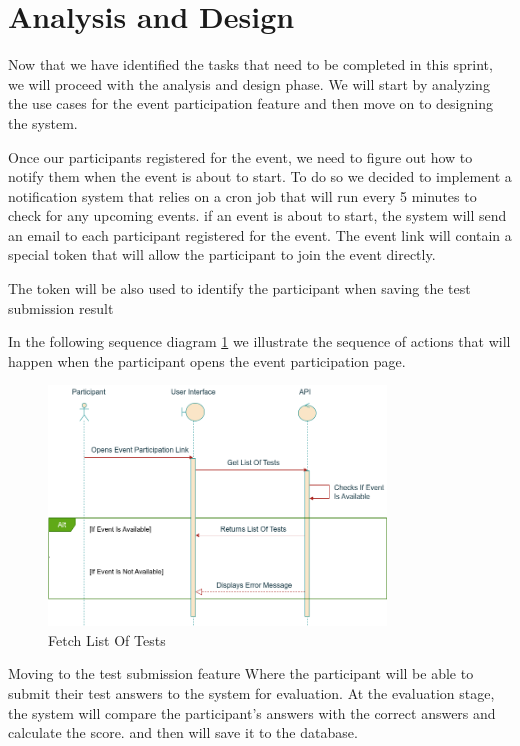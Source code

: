 \section{Analysis and Design}
Now that we have identified the tasks that need to be completed in this sprint, we will proceed with the analysis and design phase.
We will start by analyzing the use cases for the event participation feature and then move on to designing the system.

Once our participants registered for the event, we need to figure out how to notify them when the event is about to start.
To do so we decided to implement a notification system that relies on a cron job that will run every 5 minutes to check for any upcoming events.
if an event is about to start, the system will send an email to each participant registered for the event. The event link will contain a special
token that will allow the participant to join the event directly.

The token will be also used to identify the participant when saving the test submission result

In the following sequence diagram \ref{fig:fetch_list_of_tests} we illustrate the sequence of actions that will happen
when the participant opens the event participation page.

\begin{figure}[h!]
  \centering
  \includegraphics[width=0.8\textwidth]{images/sequenceChecksIfEventIsAvailable.png}
  \caption{Fetch List Of Tests}\label{fig:fetch_list_of_tests}
\end{figure}

Moving to the test submission feature Where the participant will be able to submit their test answers to the system for evaluation.
At the evaluation stage, the system will compare the participant's answers with the correct answers and calculate the score.
and then will save it to the database.

